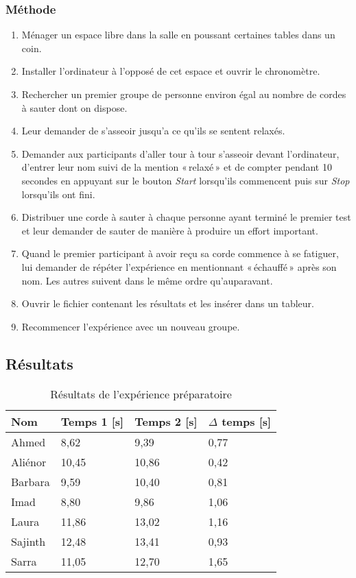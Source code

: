 \documentclass[12pt,fleqn,oneside,openany]{book} %
\begin{document}
\subsubsection{Méthode} \label{sssec:methode2.1}
\begin{enumerate}
	\item Ménager un espace libre dans la salle en poussant certaines tables dans un coin.
	\item Installer l'ordinateur à l'opposé de cet espace et ouvrir le chronomètre.
	\item Rechercher un premier groupe de personne environ égal au nombre de cordes à sauter dont on dispose.
	\item Leur demander de s'asseoir jusqu'a ce qu'ils se sentent relaxés.
	\item Demander aux participants d'aller tour à tour s'asseoir devant l'ordinateur, d'entrer leur nom suivi de la mention «\,relaxé\,» et de compter pendant 10 secondes en appuyant sur le bouton \emph{Start} lorsqu'ils commencent puis sur \emph{Stop} lorsqu'ils ont fini.
	\item Distribuer une corde à sauter à chaque personne ayant terminé le premier test et leur demander de sauter de manière à produire un effort important.
	\item Quand le premier participant à avoir reçu sa corde commence à se fatiguer, lui demander de répéter l'expérience en mentionnant «\,échauffé\,» après son nom. Les autres suivent dans le même ordre qu'auparavant.
	\item Ouvrir le fichier contenant les résultats et les insérer dans un tableur.
	\item Recommencer l'expérience avec un nouveau groupe.
\end{enumerate}

\subsection{Résultats} \label{ssec:resultats2.1}

\begin{table}[h]
	\centering
	\caption{Résultats de l'expérience préparatoire} \label{tbl:exp2.1P}
	\begin{tabular}{llll}
		\toprule 
		\textbf{Nom} & \textbf{Temps 1 [s]} & \textbf{Temps 2 [s]} & \textbf{$\Delta$ temps [s]} \\ \midrule
		Ahmed & 8,62 & 9,39 & 0,77 \\
		Aliénor & 10,45 & 10,86 & 0,42 \\
		Barbara & 9,59 & 10,40 & 0,81 \\
		Imad & 8,80 & 9,86 & 1,06 \\
		Laura & 11,86 & 13,02 & 1,16 \\
		Sajinth & 12,48 & 13,41 & 0,93 \\
		Sarra & 11,05 & 12,70 & 1,65 \\ \bottomrule
	\end{tabular}
\end{table}
\end{document}
